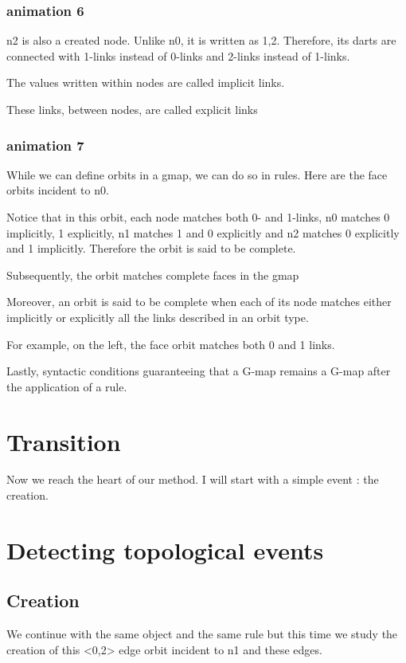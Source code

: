 \documentclass[11pt]{article}
\begin{document}
\subsubsection{animation 6}
\label{sec:orgd250abd}
n2 is also a created node. Unlike n0, it is written as 1,2. Therefore, its darts
are connected with 1-links instead of 0-links and 2-links instead of 1-links.

The values written within nodes are called implicit links.

These links, between nodes, are called explicit links
\subsubsection{animation 7}
\label{sec:org911faaa}
While we can define orbits in a gmap, we can do so in rules. Here are the face
orbits incident to n0.

Notice that in this orbit, each node matches both 0- and 1-links, n0 matches 0
implicitly, 1 explicitly, n1 matches 1 and 0 explicitly and n2 matches 0
explicitly and 1 implicitly. Therefore the orbit is said to be complete.

Subsequently, the orbit matches complete faces in the gmap

Moreover, an orbit is said to be complete when each of its node matches either
implicitly or explicitly all the links described in an orbit type.

For example, on the left, the face orbit matches both 0 and 1 links.

Lastly, syntactic conditions guaranteeing that a G-map remains a G-map
after the application of a rule.

\section{Transition}
\label{sec:orgd5aef57}
Now we reach the heart of our method. I will start with a simple event : the
creation.

\section{Detecting topological events}
\label{sec:org19fb51e}

\subsection{Creation}
\label{sec:org0f816a7}

We continue with the same object and the same rule but this time we study the
creation of this <0,2> edge orbit incident to n1 and these edges.
\end{document}
